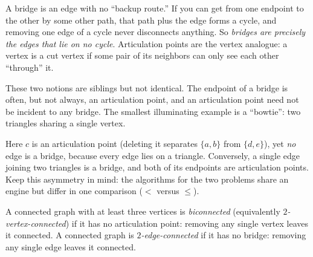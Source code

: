 \begin{intuitionbox}
A bridge is an edge with no ``backup route.'' If you can get from one endpoint to the
other by some other path, that path plus the edge forms a cycle, and removing one
edge of a cycle never disconnects anything. So \emph{bridges are precisely the edges
that lie on no cycle}. Articulation points are the vertex analogue: a vertex is a cut
vertex if some pair of its neighbors can only see each other ``through'' it.
\end{intuitionbox}

These two notions are siblings but not identical. The endpoint of a bridge is often,
but not always, an articulation point, and an articulation point need not be incident
to any bridge. The smallest illuminating example is a ``bowtie'': two triangles
sharing a single vertex.

\begin{center}
\end{center}

Here $c$ is an articulation point (deleting it separates $\{a,b\}$ from $\{d,e\}$), yet
\emph{no} edge is a bridge, because every edge lies on a triangle. Conversely, a single
edge joining two triangles is a bridge, and both of its endpoints are articulation
points. Keep this asymmetry in mind: the algorithms for the two problems share an
engine but differ in one comparison ($<$ versus $\le$).

\begin{definition}
\label{ch10:def-biconn}
A connected graph with at least three vertices is \emph{biconnected} (equivalently
\emph{$2$-vertex-connected}) if it has no articulation point: removing any single
vertex leaves it connected. A connected graph is \emph{$2$-edge-connected} if it has
no bridge: removing any single edge leaves it connected.
\end{definition}


